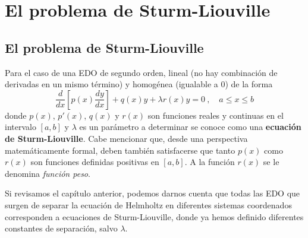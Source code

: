 \chapter{El problema de Sturm-Liouville} \label{cap:series-sl}




\section{El problema de Sturm-Liouville}

Para el caso de una EDO de segundo orden, lineal (no hay combinación de derivadas en un mismo término) y homogénea (igualable a 0) de la forma
\begin{equation} \label{eq:Sturm-Liouville}
    \frac{d}{dx}\left[ p(x) \frac{dy}{dx} \right] + q(x) y + \lambda r(x)y = 0 \ , \quad a \leq x \leq b
\end{equation}
donde $p(x)$, $p'(x)$, $q(x)$ y $r(x)$ son funciones reales y continuas en el intervalo $[a,b]$ y $\lambda$ es un parámetro a determinar se conoce como una \textbf{ecuación de Sturm-Liouville}. Cabe mencionar que, desde una perspectiva matemáticamente formal, deben también satisfacerse que tanto $p(x)$ como $r(x)$ son funciones definidas positivas en $[a,b]$. A la función $r(x)$ se le denomina \emph{función peso}.

Si revisamos el capítulo anterior, podemos darnos cuenta que todas las EDO que surgen de separar la ecuación de Helmholtz en diferentes sistemas coordenados corresponden a ecuaciones de Sturm-Liouville, donde ya hemos definido diferentes constantes de separación, salvo $\lambda$.

